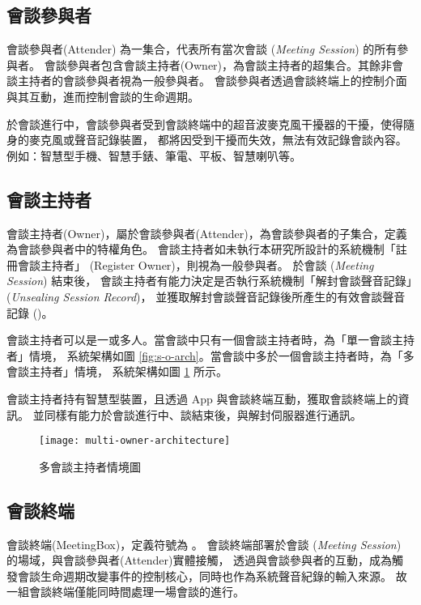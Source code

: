 \subsection{會談參與者}

    會談參與者(Attender) 為一集合，代表所有當次會談 ({\it Meeting Session}) 的所有參與者。
會談參與者包含會談主持者(Owner)，為會談主持者的超集合。其餘非會談主持者的會談參與者視為一般參與者。
會談參與者透過會談終端上的控制介面與其互動，進而控制會談的生命週期。

    於會談進行中，會談參與者受到會談終端中的超音波麥克風干擾器的干擾，使得隨身的麥克風或聲音記錄裝置，
都將因受到干擾而失效，無法有效記錄會談內容。例如：智慧型手機、智慧手錶、筆電、平板、智慧喇叭等。


\subsection{會談主持者}

    會談主持者(Owner)，屬於會談參與者(Attender)，為會談參與者的子集合，定義為會談參與者中的特權角色。
會談主持者如未執行本研究所設計的系統機制「註冊會談主持者」 (Register Owner)，則視為一般參與者。
於會談 ({\it Meeting Session}) 結束後，
會談主持者有能力決定是否執行系統機制「解封會談聲音記錄」({\it Unsealing Session Record})，
並獲取解封會談聲音記錄後所產生的有效會談聲音記錄 (\DEFrecREV)。

    會談主持者可以是一或多人。當會談中只有一個會談主持者時，為「單一會談主持者」情境，
系統架構如圖 \ref{fig:s-o-arch}。當會談中多於一個會談主持者時，為「多會談主持者」情境，
系統架構如圖 \ref{fig:m-o-arch} 所示。

    會談主持者持有智慧型裝置，且透過 App 與會談終端互動，獲取會談終端上的資訊。
並同樣有能力於會談進行中、談結束後，與解封伺服器進行通訊。

\begin{figure}[H]
    \centering
    \texttt{[image: multi-owner-architecture]}
    \caption{多會談主持者情境圖}\label{fig:m-o-arch}
\end{figure}


\subsection{會談終端}

    會談終端(MeetingBox)，定義符號為 \DEFmeetingbox 。
會談終端部署於會談 ({\it Meeting Session}) 的場域，與會談參與者(Attender)實體接觸，
透過與會談參與者的互動，成為觸發會談生命週期改變事件的控制核心，同時也作為系統聲音紀錄的輸入來源。
故一組會談終端僅能同時間處理一場會談的進行。

